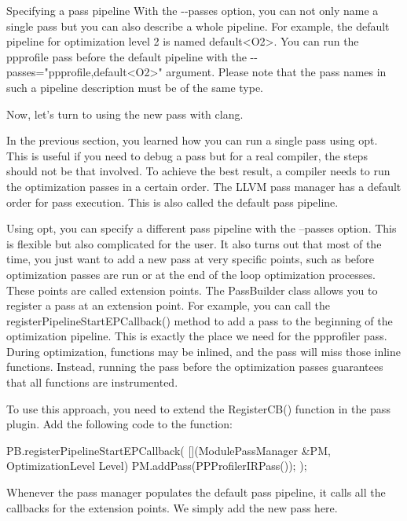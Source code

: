 \begin{myTip}{Specifying a pass pipeline}
With the -{}-passes option, you can not only name a single pass but you can also describe a whole pipeline. For example, the default pipeline for optimization level 2 is named default<O2>. You can run the ppprofile pass before the default pipeline with the -{}-passes="ppprofile,default<O2>" argument. Please note that the pass names in such a pipeline description must be of the same type.
\end{myTip}

Now, let’s turn to using the new pass with clang.


In the previous section, you learned how you can run a single pass using opt. This is useful if you need to debug a pass but for a real compiler, the steps should not be that involved.
To achieve the best result, a compiler needs to run the optimization passes in a certain order. The LLVM pass manager has a default order for pass execution. This is also called the default pass pipeline.

Using opt, you can specify a different pass pipeline with the –passes option. This is flexible but also complicated for the user. It also turns out that most of the time, you just want to add a new pass at very specific points, such as before optimization passes are run or at the end of the loop optimization processes. These points are called extension points. The PassBuilder class allows you to register a pass at an extension point. For example, you can call the registerPipelineStartEPCallback() method to add a pass to the beginning of the optimization pipeline. This is exactly the place we need for the ppprofiler pass. During optimization, functions may be inlined, and the pass will miss those inline functions. Instead, running the pass before the optimization passes guarantees that all functions are instrumented.

To use this approach, you need to extend the RegisterCB() function in the pass plugin. Add the following code to the function:

\begin{cpp}
PB.registerPipelineStartEPCallback(
    [](ModulePassManager &PM, OptimizationLevel Level) {
        PM.addPass(PPProfilerIRPass());
    });
\end{cpp}

Whenever the pass manager populates the default pass pipeline, it calls all the callbacks for the extension points. We simply add the new pass here.

